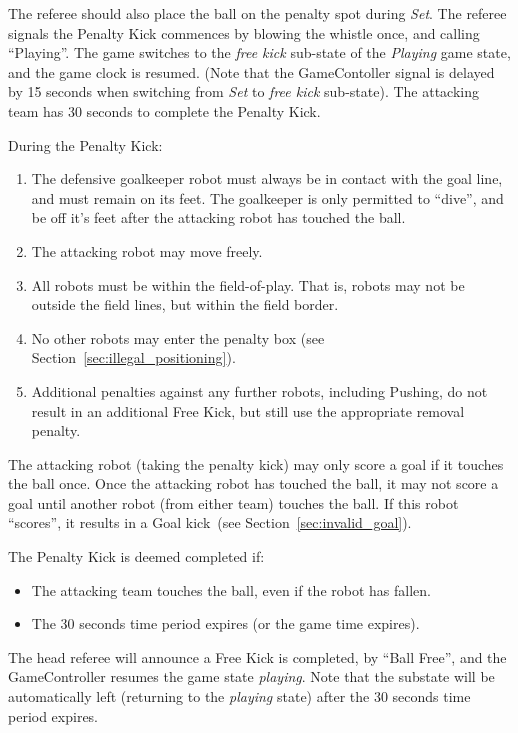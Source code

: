 \documentclass[12pt]{article}
\newcommand{\cf}{see\xspace}
\newcommand{\PlayingDelayTime}{15 seconds\xspace}
\newcommand{\PenaltyFreeKickTime}{30 seconds\xspace}
\begin{document}
The referee should also place the ball on the penalty spot during \textit{Set}.
The referee signals the Penalty Kick commences by blowing the whistle once, and calling ``Playing''.
The game switches to the \textit{free kick} sub-state of the \textit{Playing} game state, and the game clock is resumed.
(Note that the GameContoller signal is delayed by \PlayingDelayTime when switching from \textit{Set} to \textit{free kick} sub-state).
The attacking team has \PenaltyFreeKickTime to complete the Penalty Kick.

During the Penalty Kick:
\begin{enumerate}
    \item The defensive goalkeeper robot must always be in contact with the goal line, and must remain on its feet. The goalkeeper is only permitted to ``dive'', and be off it's feet after the attacking robot has touched the ball.
    \item The attacking robot may move freely.
    \item All robots must be within the field-of-play. That is, robots may not be outside the field lines, but within the field border.
    \item No other robots may enter the penalty box (\cf Section~\ref{sec:illegal_positioning}).
    \item Additional penalties against any further robots, including Pushing, do not result in an additional Free
    Kick, but still use the appropriate removal penalty.
\end{enumerate}

The attacking robot (taking the penalty kick) may only score a goal if it touches the ball once.
Once the attacking robot has touched the ball, it may not score a goal until another robot (from either team) touches the ball.
If this robot ``scores'', it results in a Goal kick~(\cf Section~\ref{sec:invalid_goal}).

The Penalty Kick is deemed completed if:
\begin{itemize}
\item The attacking team touches the ball, even if the robot has fallen.
\item The \PenaltyFreeKickTime time period expires (or the game time expires).
\end{itemize}

The head referee will announce a Free Kick is completed, by ``Ball Free'', and the GameController
resumes the game state \emph{playing}. Note that the substate will be automatically left (returning to the \textit{playing} state) after the \PenaltyFreeKickTime time period expires.
\end{document}
